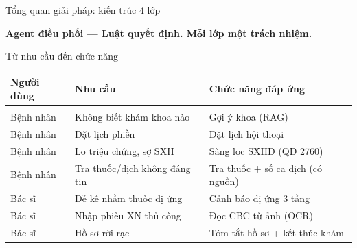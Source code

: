 \documentclass[aspectratio=169,t]{beamer}
\begin{document}
\begin{frame}{Tổng quan giải pháp: kiến trúc 4 lớp}
  \centering
  \vspace{0.2cm}
  \begin{center}\small\color{hustprimary}\textbf{Agent điều phối — Luật quyết định. Mỗi lớp một trách nhiệm.}\end{center}
\end{frame}

\begin{frame}{Từ nhu cầu đến chức năng}
  \footnotesize
  \begin{center}
  \begin{tabular}{@{}p{2.2cm} p{4.6cm} p{4.6cm}@{}}
    \textbf{Người dùng} & \textbf{Nhu cầu} & \textbf{Chức năng đáp ứng} \\[2pt]
    \hline\\[-6pt]
    Bệnh nhân & Không biết khám khoa nào & Gợi ý khoa (RAG) \\
    Bệnh nhân & Đặt lịch phiền & Đặt lịch hội thoại \\
    Bệnh nhân & Lo triệu chứng, sợ SXH & Sàng lọc SXHD (QĐ 2760) \\
    Bệnh nhân & Tra thuốc/dịch không đáng tin & Tra thuốc + số ca dịch (có nguồn) \\
    Bác sĩ & Dễ kê nhầm thuốc dị ứng & Cảnh báo dị ứng 3 tầng \\
    Bác sĩ & Nhập phiếu XN thủ công & Đọc CBC từ ảnh (OCR) \\
    Bác sĩ & Hồ sơ rời rạc & Tóm tắt hồ sơ + kết thúc khám \\
  \end{tabular}
  \end{center}
\end{frame}
\end{document}
